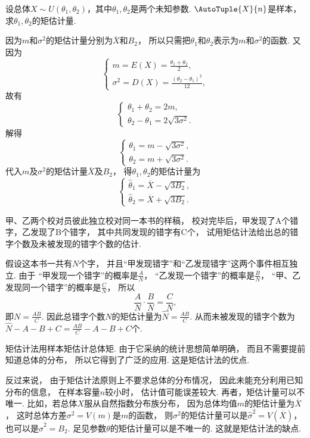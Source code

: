 \begin{example}
设总体\(X \sim U(\theta_1,\theta_2)\)，其中\(\theta_1,\theta_2\)是两个未知参数.
\(\AutoTuple{X}{n}\)是样本，求\(\theta_1,\theta_2\)的矩估计量.
\begin{solution}
因为\(m\)和\(\sigma^2\)的矩估计量分别为\(\overline{X}\)和\(B_2\)，
所以只需把\(\theta_1\)和\(\theta_2\)表示为\(m\)和\(\sigma^2\)的函数.
又因为\[
	\begin{cases}
		m = E(X) = \frac{\theta_1+\theta_2}{2}, \\
		\sigma^2 = D(X) = \frac{(\theta_2-\theta_1)^2}{12},
	\end{cases}
\]
故有\[
	\begin{cases}
		\theta_1+\theta_2 = 2m, \\
		\theta_2-\theta_1 = 2 \sqrt{3\sigma^2}.
	\end{cases}
\]
解得\[
	\begin{cases}
		\theta_1 = m - \sqrt{3\sigma^2}, \\
		\theta_2 = m + \sqrt{3\sigma^2}.
	\end{cases}
\]
代入\(m\)及\(\sigma^2\)的矩估计量\(\overline{X}\)及\(B_2\)，
得\(\theta_1,\theta_2\)的矩估计量为\[
	\begin{cases}
		\hat{\theta}_1 = \overline{X} - \sqrt{3 B_2}, \\
		\hat{\theta}_2 = \overline{X} + \sqrt{3 B_2}.
	\end{cases}
\]
\end{solution}
\end{example}

\begin{example}
甲、乙两个校对员彼此独立校对同一本书的样稿，
校对完毕后，甲发现了A个错字，乙发现了B个错字，
其中共同发现的错字有C个，
试用矩估计法给出总的错字个数及未被发现的错字个数的估计.
\begin{solution}
假设这本书一共有\(N\)个字，
并且“甲发现错字”和“乙发现错字”这两个事件相互独立.
由于
“甲发现一个错字”的概率是\(\frac{A}{N}\)，
“乙发现一个错字”的概率是\(\frac{B}{N}\)，
“甲、乙发现同一个错字”的概率是\(\frac{C}{N}\)，
所以\[
	\frac{A}{N}\cdot\frac{B}{N}=\frac{C}{N},
\]
即\(N=\frac{AB}{C}\).
因此总错字个数\(N\)的矩估计量为\(\hat{N}=\frac{AB}{C}\).
从而未被发现的错字个数为\(\hat{N}-A-B+C=\frac{AB}{C}-A-B+C\)个.
\end{solution}
\end{example}

\begin{remark}
矩估计法用样本矩估计总体矩.
由于它采纳的统计思想简单明确，
而且不需要提前知道总体的分布，
所以它得到了广泛的应用.
这是矩估计法的优点.

反过来说，
由于矩估计法原则上不要求总体的分布情况，
因此未能充分利用已知分布的信息，
在样本容量\(n\)较小时，
估计值可能误差较大.
再者，矩估计量可以不唯一.
比如，若总体\(X\)服从自然指数分布族分布，
因为总体均值\(m\)的矩估计量为\(\overline{X}\)，
这时总体方差\(\sigma^2 = V(m)\)是\(m\)的函数，
则\(\sigma^2\)的矩估计量可以是\(\hat{\sigma}^2 = V(\overline{X})\)，
也可以是\(\hat{\sigma}^2 = B_2\).
足见参数\(\theta\)的矩估计量可以是不唯一的.
这就是矩估计法的缺点.
\end{remark}
